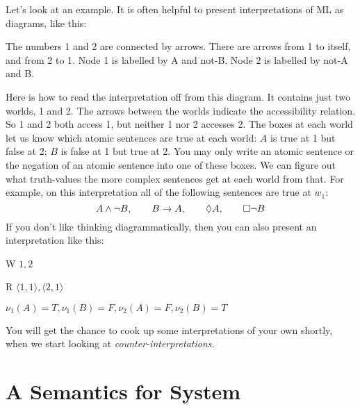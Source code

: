 Let's look at an example. It is often helpful to present interpretations of ML as diagrams, like this:
\begin{center}
	\begin{arialabel}{The numbers 1 and 2 are connected by arrows. There are arrows from 1 to itself, and from 2 to 1. Node 1 is labelled by A and not-B. Node 2 is labelled by not-A and B.}
\end{arialabel}
\end{center}
Here is how to read the interpretation off from this diagram. It contains just two worlds, 1 and 2. The arrows between the worlds indicate the accessibility relation. So 1 and 2 both access 1, but neither 1 nor 2 accesses 2. The boxes at each world let us know which atomic sentences are true at each world: $A$ is true at 1 but false at 2; $B$ is false at 1 but true at 2. You may only write an atomic sentence or the negation of an atomic sentence into one of these boxes. We can figure out what truth-values the more complex sentences get at each world from that. For example, on this interpretation all of the following sentences are true at $w_1$:
\[
A\wedge\neg B,\qquad B\rightarrow A,\qquad \Diamond A,\qquad \Box\neg B
\]
If you don't like thinking diagrammatically, then you can also present an interpretation like this:
\begin{ekey}
	\item[W]$1,2$
	\item[R]$\langle 1,1\rangle, \langle 2,1\rangle$
	\item[\nu]$\nu_{1}(A)=T, \nu_{1}(B)=F, \nu_{2}(A)=F, \nu_{2}(B)=T$
\end{ekey}
You will get the chance to cook up some interpretations of your own shortly, when we start looking at \emph{counter-interpretations}.

\section{A Semantics for System \mlK}
\label{SemanticsK}

